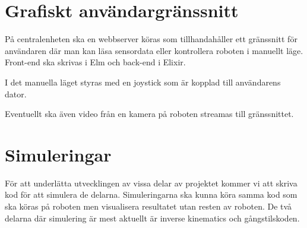 \documentclass[a4paper,titlepage,12pt]{article}
\begin{document}
	\section{Grafiskt användargränssnitt}
    
    På centralenheten ska en webbserver köras som tillhandahåller ett gränssnitt
    för användaren där man kan läsa sensordata eller kontrollera roboten i
    manuellt läge. Front-end ska skrivas i Elm och back-end i Elixir.

    I det manuella läget styras med en joystick som är kopplad till användarens
    dator.
    
    Eventuellt ska även video från en kamera på roboten streamas till gränssnittet.
    

	\section{Simuleringar}
    För att underlätta utvecklingen av vissa delar av projektet kommer vi att skriva
	kod för att simulera de delarna. Simuleringarna ska kunna köra samma kod som ska
	köras på roboten men visualisera resultatet utan resten av roboten. De två
	delarna där simulering är mest aktuellt är inverse kinematics och gångstilskoden.
\end{document}
